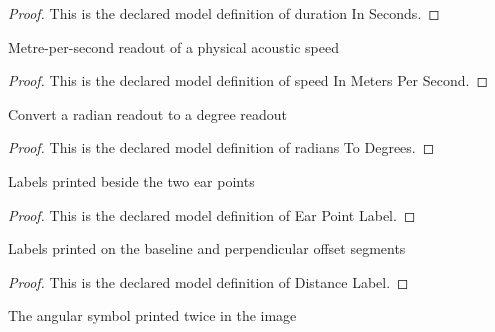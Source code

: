 \begin{proof}
  This is the declared model definition of duration In Seconds.
\end{proof}
\begin{definition}
  \label{def:physics:phyx-mini-0308:phyxminiproblems-problemphyxmini0308-speedinmeterspersecond}
  Metre-per-second readout of a physical acoustic speed
\end{definition}
\begin{proof}
  This is the declared model definition of speed In Meters Per Second.
\end{proof}
\begin{definition}
  \label{def:physics:phyx-mini-0308:phyxminiproblems-problemphyxmini0308-radianstodegrees}
  Convert a radian readout to a degree readout
\end{definition}
\begin{proof}
  This is the declared model definition of radians To Degrees.
\end{proof}
\begin{definition}
  \label{def:physics:phyx-mini-0308:phyxminiproblems-problemphyxmini0308-earpointlabel}
  Labels printed beside the two ear points
\end{definition}
\begin{proof}
  This is the declared model definition of Ear Point Label.
\end{proof}
\begin{definition}
  \label{def:physics:phyx-mini-0308:phyxminiproblems-problemphyxmini0308-distancelabel}
  Labels printed on the baseline and perpendicular offset segments
\end{definition}
\begin{proof}
  This is the declared model definition of Distance Label.
\end{proof}
\begin{definition}
  \label{def:physics:phyx-mini-0308:phyxminiproblems-problemphyxmini0308-bearinglabel}
  The angular symbol printed twice in the image
\end{definition}
